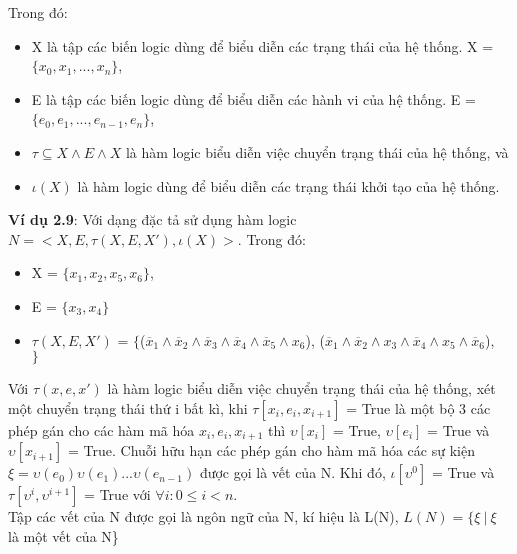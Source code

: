 \documentclass[a4paper,13pt,oneside,openany]{book}
\begin{document}
\begin{flushleft}
		Trong đó:\\
		\begin{itemize}
			\item X là tập các biến logic dùng để biểu diễn các trạng thái của hệ thống. X = $\{x_0, x_1, ..., x_n\}$,
			\item E là tập các biến logic dùng để biểu diễn các hành vi của hệ thống. E = $\{e_0, e_1, ..., e_{n-1}, e_n\}$,
			\item $\tau \subseteq X \land E \land X$ là hàm logic biểu diễn việc chuyển trạng thái của hệ thống, và
			\item $\iota(X)$ là hàm logic dùng để biểu diễn các trạng thái khởi tạo của hệ thống.
		\end{itemize}
		\textbf{Ví dụ 2.9}: Với dạng đặc tả sử dụng hàm logic $N = <X, E, \tau(X, E, X'), \iota(X)>$. Trong đó:\\
		\begin{itemize}
			\item X = $\{x_1, x_2, x_5, x_6\}$,
			\item E = $\{x_3, x_4\}$
			\item $\tau(X, E, X')$ = $\{$($\overline{x}_1 \land \overline{x}_2 \land \overline{x}_3 \land \overline{x}_4 \land \overline{x}_5 \land x_6$), ($\overline{x}_1\land\overline{x}_2\land x_3\land \overline{x}_4\land x_5\land\overline{x}_6$),\\
			$\}$
		\end{itemize}
		
		Với $\tau(x, e, x')$ là hàm logic biểu diễn việc chuyển trạng thái của hệ thống, xét một chuyển trạng thái thứ i bất kì, khi $\tau[x_i, e_i, x_{i+1}]$ = True là một bộ 3 các phép gán cho các hàm mã hóa $x_i, e_i, x_{i+1}$ thì $\upsilon[x_i]$ = True, $\upsilon[e_i]$ = True và $\upsilon[x_{i+1}]$ = True. Chuỗi hữu hạn các phép gán cho hàm mã hóa các sự kiện $\xi = \upsilon(e_0)\upsilon(e_1)...\upsilon(e_{n-1})$ được gọi là vết của N. Khi đó, $\iota[\upsilon^0]$ = True và $\tau[\upsilon^i,  \upsilon^{i+1}]$ = True với $\forall i: 0 \leq i < n$.\\
				Tập các vết của N được gọi là ngôn ngữ của N, kí hiệu là L(N), $L(N) = \{\xi\ |\ \xi$ là một vết của N\}\\


\end{flushleft}
\end{document}
